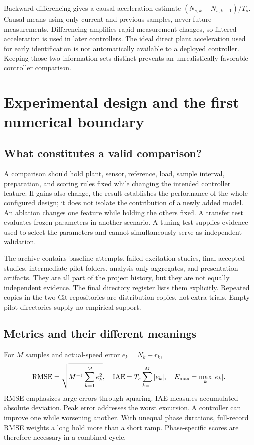 Backward differencing gives a causal acceleration estimate $(N_{s,k}-N_{s,k-1})/T_s$. Causal means using only current and previous samples, never future measurements. Differencing amplifies rapid measurement changes, so filtered acceleration is used in later controllers. The ideal direct plant acceleration used for early identification is not automatically available to a deployed controller. Keeping those two information sets distinct prevents an unrealistically favorable controller comparison.



\section{Experimental design and the first numerical boundary}
\subsection{What constitutes a valid comparison?}
A comparison should hold plant, sensor, reference, load, sample interval, preparation, and scoring rules fixed while changing the intended controller feature. If gains also change, the result establishes the performance of the whole configured design; it does not isolate the contribution of a newly added model. An ablation changes one feature while holding the others fixed. A transfer test evaluates frozen parameters in another scenario. A tuning test supplies evidence used to select the parameters and cannot simultaneously serve as independent validation.

The archive contains baseline attempts, failed excitation studies, final accepted studies, intermediate pilot folders, analysis-only aggregates, and presentation artifacts. They are all part of the project history, but they are not equally independent evidence. The final directory register lists them explicitly. Repeated copies in the two Git repositories are distribution copies, not extra trials. Empty pilot directories supply no empirical support.

\subsection{Metrics and their different meanings}
For $M$ samples and actual-speed error $e_k=N_k-r_k$,
\begin{equation}\operatorname{RMSE}=\sqrt{M^{-1}\sum_{k=1}^M e_k^2},\quad
\mathrm{IAE}=T_s\sum_{k=1}^M|e_k|,\quad E_{\max}=\max_k|e_k|.
\end{equation}
RMSE emphasizes large errors through squaring. IAE measures accumulated absolute deviation. Peak error addresses the worst excursion. A controller can improve one while worsening another. With unequal phase durations, full-record RMSE weights a long hold more than a short ramp. Phase-specific scores are therefore necessary in a combined cycle.

